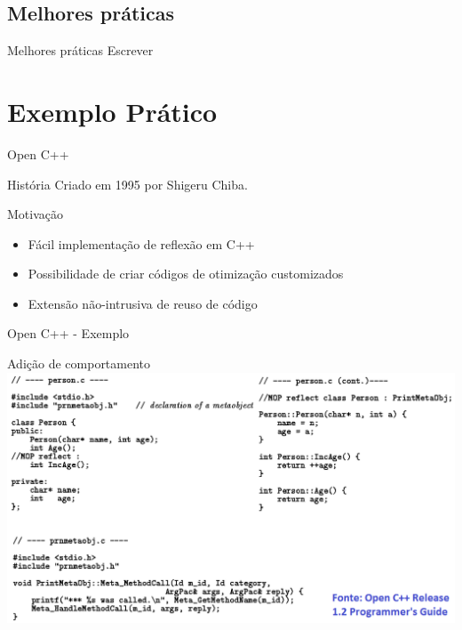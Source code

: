 \documentclass[12pt,t]{beamer}
\begin{document}
 	 \subsection{Melhores práticas}
	 \begin{frame}{Melhores práticas}
	 	\alert{Escrever}
 	 \end{frame}
 	\section{Exemplo Prático}
	 \begin{frame}{Open C++}
	 	\begin{block}{História}
			Criado em 1995 por Shigeru Chiba.
 	 	\end{block}
 	 	\pause
	 	\begin{block}{Motivação}
			\begin{itemize}
 	 			\item Fácil implementação de reflexão em C++
 	 			\pause
 	 			\item Possibilidade de criar códigos de otimização customizados
 	 			\pause
				\item Extensão não-intrusiva de reuso de código
 	 		\end{itemize}
 	 	\end{block}
	 \end{frame}
	 \begin{frame}{Open C++ - Exemplo}
 	 	\begin{block}{Adição de comportamento}
 	 		\includegraphics[width=1\textwidth]{examples/example_open_cxx}
 	 	\end{block}
	 \end{frame}
\end{document}
